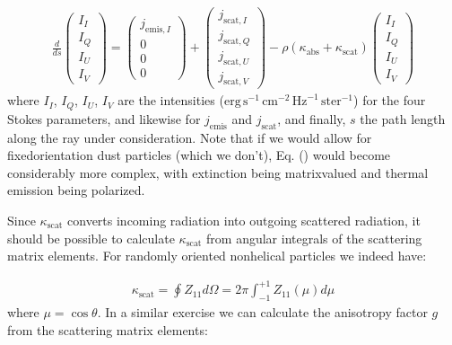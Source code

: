 \documentclass[letterpaper,10pt,english]{sphinxmanual}
\begin{document}
\label{\detokenize{dustradtrans:eq-radtrans-randomorient}}\begin{equation*}
\begin{split}\frac{d}{ds}\left(
\begin{matrix}
I_I\\I_Q\\I_U\\I_V
\end{matrix}
\right)
=
\left(
\begin{matrix}
j_{\mathrm{emis},I}\\0\\0\\0
\end{matrix}
\right)
+
\left(
\begin{matrix}
j_{\mathrm{scat},I}\\j_{\mathrm{scat},Q}\\j_{\mathrm{scat},U}\\j_{\mathrm{scat},V}
\end{matrix}
\right)
-\rho(\kappa_{\mathrm{abs}}+\kappa_{\mathrm{scat}})
\left(
\begin{matrix}
I_I\\I_Q\\I_U\\I_V
\end{matrix}
\right)\end{split}
\end{equation*}
where \(I_I\), \(I_Q\), \(I_U\), \(I_V\) are the intensities
(\(\mathrm{erg}\,\mathrm{s}^{-1}\,\mathrm{cm}^{-2}\,\mathrm{Hz}^{-1}\,\mathrm{ster}^{-1}\))
for the four Stokes parameters, and likewise for
\(j_{\mathrm{emis}}\) and \(j_{\mathrm{scat}}\), and finally, \(s\)
the path length along the ray under consideration. Note that if we would allow
for fixed\sphinxhyphen{}orientation dust particles (which we don’t),
Eq. () would become considerably more complex,
with extinction being matrix\sphinxhyphen{}valued and thermal emission being polarized.

Since \(\kappa_{\mathrm{scat}}\) converts incoming radiation into outgoing
scattered radiation, it should be possible to calculate
\(\kappa_{\mathrm{scat}}\) from angular integrals of the scattering matrix
elements. For randomly oriented non\sphinxhyphen{}helical particles we indeed have:

\label{\detokenize{dustradtrans:eq-scatmat-selfconsist-kappa}}\begin{equation*}
\begin{split}\kappa_{\mathrm{scat}} = \oint Z_{11} d\Omega =
2\pi \int_{-1}^{+1}Z_{11}(\mu)d\mu\end{split}
\end{equation*}
where \(\mu=\cos\theta\). In a similar exercise we can calculate the
anisotropy factor \(g\) from the scattering matrix elements:
\end{document}
